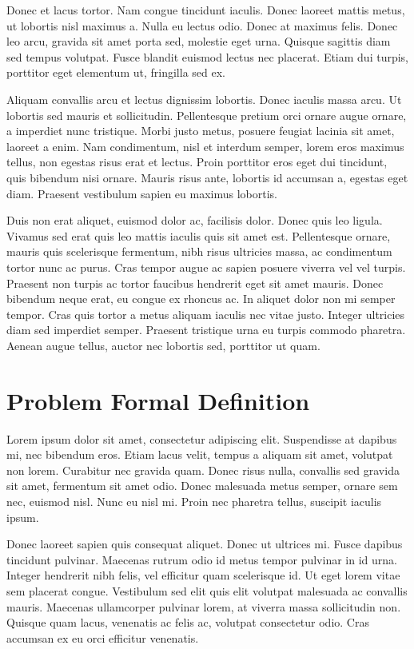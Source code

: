 Donec et lacus tortor. Nam congue tincidunt iaculis. Donec laoreet mattis metus, ut lobortis nisl maximus a. Nulla eu lectus odio. Donec at maximus felis. Donec leo arcu, gravida sit amet porta sed, molestie eget urna. Quisque sagittis diam sed tempus volutpat. Fusce blandit euismod lectus nec placerat. Etiam dui turpis, porttitor eget elementum ut, fringilla sed ex.

Aliquam convallis arcu et lectus dignissim lobortis. Donec iaculis massa arcu. Ut lobortis sed mauris et sollicitudin. Pellentesque pretium orci ornare augue ornare, a imperdiet nunc tristique. Morbi justo metus, posuere feugiat lacinia sit amet, laoreet a enim. Nam condimentum, nisl et interdum semper, lorem eros maximus tellus, non egestas risus erat et lectus. Proin porttitor eros eget dui tincidunt, quis bibendum nisi ornare. Mauris risus ante, lobortis id accumsan a, egestas eget diam. Praesent vestibulum sapien eu maximus lobortis.

Duis non erat aliquet, euismod dolor ac, facilisis dolor. Donec quis leo ligula. Vivamus sed erat quis leo mattis iaculis quis sit amet est. Pellentesque ornare, mauris quis scelerisque fermentum, nibh risus ultricies massa, ac condimentum tortor nunc ac purus. Cras tempor augue ac sapien posuere viverra vel vel turpis. Praesent non turpis ac tortor faucibus hendrerit eget sit amet mauris. Donec bibendum neque erat, eu congue ex rhoncus ac. In aliquet dolor non mi semper tempor. Cras quis tortor a metus aliquam iaculis nec vitae justo. Integer ultricies diam sed imperdiet semper. Praesent tristique urna eu turpis commodo pharetra. Aenean augue tellus, auctor nec lobortis sed, porttitor ut quam.

\section{Problem Formal Definition}
Lorem ipsum dolor sit amet, consectetur adipiscing elit. Suspendisse at dapibus mi, nec bibendum eros. Etiam lacus velit, tempus a aliquam sit amet, volutpat non lorem. Curabitur nec gravida quam. Donec risus nulla, convallis sed gravida sit amet, fermentum sit amet odio. Donec malesuada metus semper, ornare sem nec, euismod nisl. Nunc eu nisl mi. Proin nec pharetra tellus, suscipit iaculis ipsum.

Donec laoreet sapien quis consequat aliquet. Donec ut ultrices mi. Fusce dapibus tincidunt pulvinar. Maecenas rutrum odio id metus tempor pulvinar in id urna. Integer hendrerit nibh felis, vel efficitur quam scelerisque id. Ut eget lorem vitae sem placerat congue. Vestibulum sed elit quis elit volutpat malesuada ac convallis mauris. Maecenas ullamcorper pulvinar lorem, at viverra massa sollicitudin non. Quisque quam lacus, venenatis ac felis ac, volutpat consectetur odio. Cras accumsan ex eu orci efficitur venenatis.

